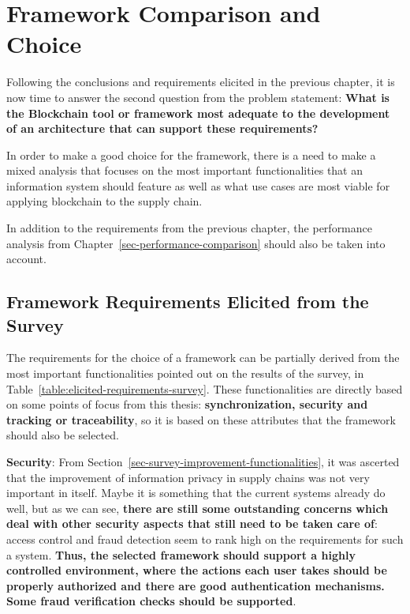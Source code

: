 \section{Framework Comparison and Choice}

Following the conclusions and requirements elicited in the previous chapter, it is now time to answer the second question from the problem statement: \textbf{What is the Blockchain tool or framework most adequate to the development of an architecture that can support these requirements?}

In order to make a good choice for the framework, there is a need to make a mixed analysis that focuses on the most important functionalities that an information system should feature as well as what use cases are most viable for applying blockchain to the supply chain. %

In addition to the requirements from the previous chapter, the performance analysis from Chapter~\ref{sec-performance-comparison} should also be taken into account. %

\subsection{Framework Requirements Elicited from the Survey}

The requirements for the choice of a framework can be partially derived from the most important functionalities pointed out on the results of the survey, in Table~\ref{table:elicited-requirements-survey}. These functionalities are directly based on some points of focus from this thesis: \textbf{synchronization, security and tracking or traceability}, so it is based on these attributes that the framework should also be selected.   

\par \textbf{Security}: From Section~\ref{sec-survey-improvement-functionalities}, it was ascerted that the improvement of information privacy in supply chains was not very important in itself. Maybe it is something that the current systems already do well, but as we can see, \textbf{there are still some outstanding concerns which deal with other security aspects that still need to be taken care of}: access control and fraud detection seem to rank high on the requirements for such a system. \textbf{Thus, the selected framework should support a highly controlled environment, where the actions each user takes should be properly authorized and there are good authentication mechanisms. Some fraud verification checks should be supported}.


